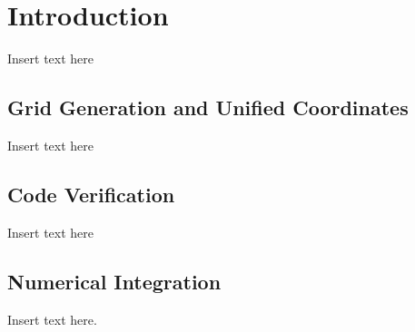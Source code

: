 \chapter{Introduction}
\label{chpt:intro}

Insert text here

\section{Grid Generation and Unified Coordinates}
\label{sec:UCS-intro}

Insert text here

\section{Code Verification}
\label{sec:VVUQ-intro}

Insert text here

\section{Numerical Integration}
\label{sec:NI-intro}

Insert text here.

